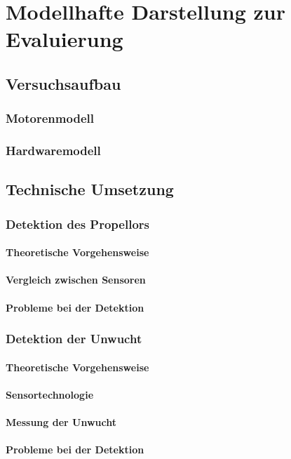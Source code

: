 
\chapter{Modellhafte Darstellung zur Evaluierung}

\section{Versuchsaufbau}

\subsection{Motorenmodell}

\subsection{Hardwaremodell}

\section{Technische Umsetzung}

\subsection{Detektion des Propellors}

\subsubsection*{Theoretische Vorgehensweise}

\subsubsection*{Vergleich zwischen Sensoren}

\subsubsection*{Probleme bei der Detektion}

\subsection{Detektion der Unwucht}

\subsubsection*{Theoretische Vorgehensweise}

\subsubsection*{Sensortechnologie}

\subsubsection*{Messung der Unwucht}

\subsubsection*{Probleme bei der Detektion}